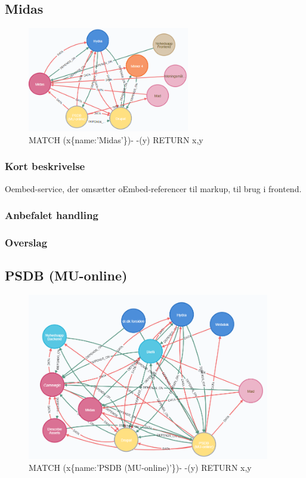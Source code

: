 \documentclass{article}
\begin{document}
\subsection{Midas}
\begin{figure}[h]
\includegraphics[width=200pt]{Midas.PNG}
\caption{MATCH (x\{name:'Midas'\})- -(y) RETURN x,y}
\end{figure}
\subsubsection{Kort beskrivelse}
Oembed-service, der omsætter oEmbed-referencer til markup, til brug i frontend.
\subsubsection{Anbefalet handling}
\subsubsection{Overslag}


\subsection{PSDB (MU-online)}
\begin{figure}[h]
\includegraphics[width=300pt]{PSDB.PNG}
\caption{MATCH (x\{name:'PSDB (MU-online)'\})- -(y) RETURN x,y}
\end{figure}
\end{document}
